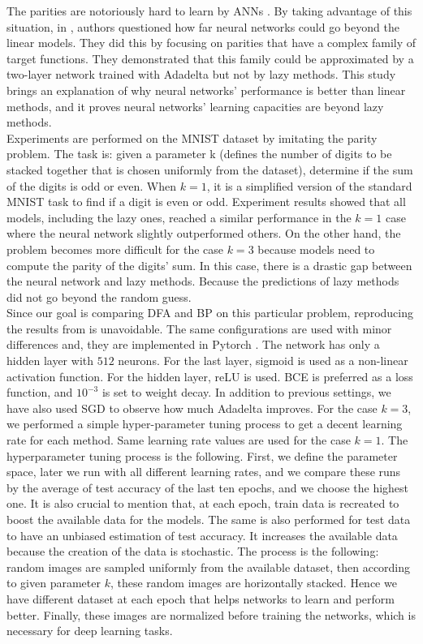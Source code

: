 \documentclass[a4paper, nobind]{templates/ociamthesis}
\begin{document}
The parities are notoriously hard to learn by ANNs \cite{DBLP:journals/corr/abs-1807-06399}. By taking advantage of this situation, in \cite{DBLP:journals/corr/abs-2002-07400}, authors questioned how far neural networks could go beyond the linear models. They did this by focusing on parities that have a complex family of target functions. They demonstrated that this family could be approximated by a two-layer network trained with Adadelta but not by lazy methods. This study brings an explanation of why neural networks' performance is better than linear methods, and it proves neural networks' learning capacities are beyond lazy methods.\\
Experiments are performed on the MNIST dataset by imitating the parity problem. The task is: given a parameter k (defines the number of digits to be stacked together that is chosen uniformly from the dataset), determine if the sum of the digits is odd or even. When \(k=1\), it is a simplified version of the standard MNIST task to find if a digit is even or odd. Experiment results showed that all models, including the lazy ones, reached a similar performance in the \(k=1\) case where the neural network slightly outperformed others. On the other hand, the problem becomes more difficult for the case \(k=3\) because models need to compute the parity of the digits' sum. In this case, there is a drastic gap between the neural network and lazy methods. Because the predictions of lazy methods did not go beyond the random guess.\\
Since our goal is comparing DFA and BP on this particular problem, reproducing the results from \cite{DBLP:journals/corr/abs-2002-07400} is unavoidable. The same configurations are used with minor differences and, they are implemented in Pytorch \cite{NEURIPS2019_9015}. The network has only a hidden layer with \(512\) neurons. For the last layer, sigmoid is used as a non-linear activation function. For the hidden layer, reLU is used. BCE is preferred as a loss function, and \(10^{-3}\) is set to weight decay. In addition to previous settings, we have also used SGD to observe how much Adadelta improves. For the case \(k=3\), we performed a simple hyper-parameter tuning process to get a decent learning rate for each method. Same learning rate values are used for the case \(k=1\). The hyperparameter tuning process is the following. First, we define the parameter space, later we run with all different learning rates, and we compare these runs by the average of test accuracy of the last ten epochs, and we choose the highest one. It is also crucial to mention that, at each epoch, train data is recreated to boost the available data for the models. The same is also performed for test data to have an unbiased estimation of test accuracy. It increases the available data because the creation of the data is stochastic. The process is the following: random images are sampled uniformly from the available dataset, then according to given parameter \(k\), these random images are horizontally stacked. Hence we have different dataset at each epoch that helps networks to learn and perform better. Finally, these images are normalized before training the networks, which is necessary for deep learning tasks.
\end{document}
